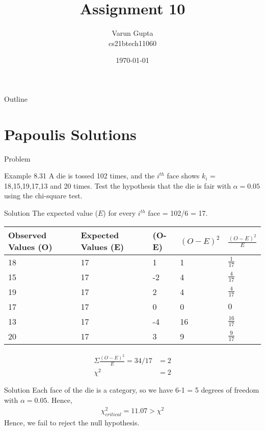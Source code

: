 \documentclass{beamer}
\title{Assignment 10}
\author{Varun Gupta \\ cs21btech11060}
\date{\today}
\begin{document}
\begin{frame}
    \titlepage
\end{frame}

\logo{}


\begin{frame}{Outline}
    \tableofcontents
\end{frame}
\section{Papoulis Solutions}
\begin{frame}{Problem}
    \begin{block}{Example 8.31}
    A die is tossed 102 times, and the $i^{th}$ face shows $k_i$ = 18,15,19,17,13 and 20 times. Test the hypothesis that the die is fair with $\alpha = 0.05$ using the chi-square test.  
    \end{block}
\end{frame}
\begin{frame}{Solution}
    The expected value ($E$) for every $i^{th}$ face = 102/6 = 17.
    \begin{table}[]
        \begin{tabular}{|l|l|l|l|l|}
        \hline
        Observed Values (O) & Expected Values (E) & (O-E) & ${(O-E)}^2$ & $\frac{{(O-E)}^2}{E}$ \\ \hline
        18                  & 17                  & 1     & 1         & $\frac{1}{17}$          \\ \hline
        15                  & 17                  & -2    & 4         & $\frac{4}{17}$         \\ \hline
        19                  & 17                  & 2     & 4         & $\frac{4}{17}$         \\ \hline
        17                  & 17                  & 0     & 0         & $0$         \\ \hline
        13                  & 17                  & -4    & 16        & $\frac{16}{17}$         \\ \hline
        20                  & 17                  & 3     & 9         & $\frac{9}{17}$         \\ \hline
        \end{tabular}
        \end{table}
        \begin{align}
            \Sigma{\frac{{(O-E)}^2}{E}} = 34/17 &= 2\\
            {\chi}^2 &= 2
        \end{align}
\end{frame}
\begin{frame}{Solution}
    Each face of the die is a category, so we have 6-1 = 5 degrees of freedom with $\alpha = 0.05$. Hence,
    \begin{align}
        {\chi}_{critical}^2 = 11.07 > {\chi}^2
    \end{align}
    Hence, we fail to reject the null hypothesis.
\end{frame}
\end{document}
